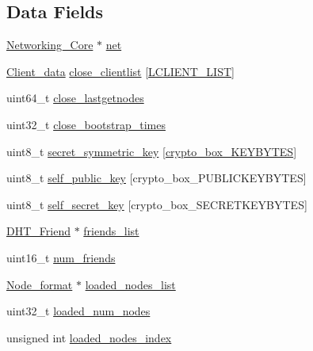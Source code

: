\subsection*{Data Fields}
\begin{DoxyCompactItemize}
\item 
\hyperlink{struct_networking___core}{Networking\+\_\+\+Core} $\ast$ \hyperlink{struct_d_h_t_aa14ea2f67950f57fe4235d7375a2216c}{net}
\item 
\hyperlink{struct_client__data}{Client\+\_\+data} \hyperlink{struct_d_h_t_a00ef35d5b0e7a791ef08a30b3bacbf9d}{close\+\_\+clientlist} \mbox{[}\hyperlink{_d_h_t_8h_a3058f857a8316099e20c95fb07adc7c1}{L\+C\+L\+I\+E\+N\+T\+\_\+\+L\+I\+S\+T}\mbox{]}
\item 
uint64\+\_\+t \hyperlink{struct_d_h_t_a3ab563f182d86c5bc6322ee416a10a32}{close\+\_\+lastgetnodes}
\item 
uint32\+\_\+t \hyperlink{struct_d_h_t_afacccecf0d2090a9dec8d06f3f119087}{close\+\_\+bootstrap\+\_\+times}
\item 
uint8\+\_\+t \hyperlink{struct_d_h_t_ab9f2ff47bc0b1e5110202a6e4be86390}{secret\+\_\+symmetric\+\_\+key} \mbox{[}\hyperlink{crypto__core_8h_aade7cd33abc5668970c55ed009ab00c8}{crypto\+\_\+box\+\_\+\+K\+E\+Y\+B\+Y\+T\+E\+S}\mbox{]}
\item 
uint8\+\_\+t \hyperlink{struct_d_h_t_ae726df8bdc26380e5a6c3187a00d6881}{self\+\_\+public\+\_\+key} \mbox{[}crypto\+\_\+box\+\_\+\+P\+U\+B\+L\+I\+C\+K\+E\+Y\+B\+Y\+T\+E\+S\mbox{]}
\item 
uint8\+\_\+t \hyperlink{struct_d_h_t_aa05050f86513ff53fe9da81f73c72267}{self\+\_\+secret\+\_\+key} \mbox{[}crypto\+\_\+box\+\_\+\+S\+E\+C\+R\+E\+T\+K\+E\+Y\+B\+Y\+T\+E\+S\mbox{]}
\item 
\hyperlink{struct_d_h_t___friend}{D\+H\+T\+\_\+\+Friend} $\ast$ \hyperlink{struct_d_h_t_ae97c6b057d770e7c4f3905cbe33b188b}{friends\+\_\+list}
\item 
uint16\+\_\+t \hyperlink{struct_d_h_t_a8ee1f2d7e543bce350c591a8eaac0cf8}{num\+\_\+friends}
\item 
\hyperlink{struct_node__format}{Node\+\_\+format} $\ast$ \hyperlink{struct_d_h_t_a3050c21873637c51d8001c807f62fa74}{loaded\+\_\+nodes\+\_\+list}
\item 
uint32\+\_\+t \hyperlink{struct_d_h_t_aef4ce67d5df5f093247c73b3a024b73e}{loaded\+\_\+num\+\_\+nodes}
\item 
unsigned int \hyperlink{struct_d_h_t_a6525da58097b462adbe2ad9000a6d77d}{loaded\+\_\+nodes\+\_\+index}
\item 

\end{DoxyCompactItemize}
